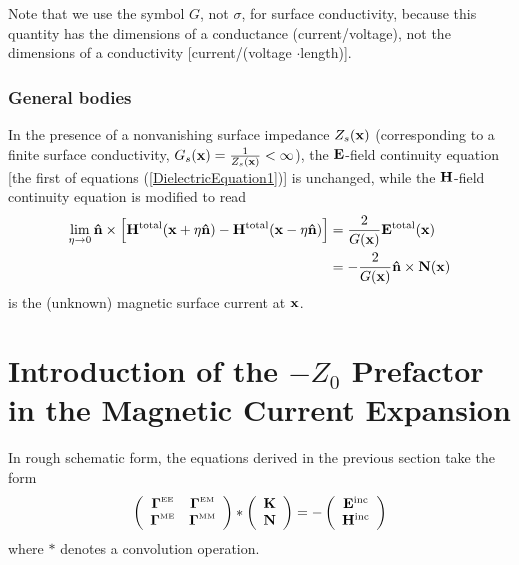 \documentclass[letterpaper]{article}
\begin{document}
Note that we use the symbol $G$, not $\sigma$, for surface
conductivity, because this quantity has the dimensions of a 
conductance (current/voltage), not the dimensions of a conductivity
[current/(voltage $\cdot $length)].

\subsubsection*{General bodies} 

In the presence of a nonvanishing surface impedance $Z_s(\mathbf{x})$
(corresponding to a finite surface conductivity, 
 $G_s(\mathbf{x}) = \frac{1}{Z_s(\mathbf{x})} < \infty$),
the $\mathbf{E}$-field continuity equation [the first of equations
(\ref{DielectricEquation1})] is unchanged, while the $\mathbf{H}$-field
continuity equation is modified to read
\begin{subequations}
\begin{align}
 \lim_{\eta \to 0} \mathbf{\hat n}\times 
 \Big[ \mathbf{H}^{\hbox{\scriptsize{total}}}(\mathbf{x} + \eta\mathbf{\hat n})
      -\mathbf{H}^{\hbox{\scriptsize{total}}}(\mathbf{x} - \eta\mathbf{\hat n})
 \Big] 
&= \frac{2}{G(\mathbf{x})} \mathbf{E}^{\hbox{\scriptsize{total}}}(\mathbf{x})
\\
&= -\frac{2}{G(\mathbf{x})} \mathbf{\hat n} \times \mathbf{N}(\mathbf{x})
\label{DielectricEquationZS}
\end{align}
\end{subequations}
is the (unknown) magnetic surface current at $\mathbf{x}$.

\newpage
\section{Introduction of the $-Z_0$ Prefactor in the 
         Magnetic Current Expansion} 

In rough schematic form, the equations derived in the 
previous section take the form 
$$ \left( \begin{array}{cc}
   \boldsymbol{\Gamma}^{\hbox{\tiny{EE}}} & \boldsymbol{\Gamma}^{\hbox{\tiny{EM}}} \\
   \boldsymbol{\Gamma}^{\hbox{\tiny{ME}}} & \boldsymbol{\Gamma}^{\hbox{\tiny{MM}}} \\
   \end{array} \right)
   *
   \left( \begin{array}{c} \mathbf{K} \\  \mathbf{N}\end{array}\right)
   = 
   -
   \left( \begin{array}{c}
   \mathbf{E}^{\hbox{\scriptsize{inc}}} \\
   \mathbf{H}^{\hbox{\scriptsize{inc}}} \\
   \end{array}\right)
$$
where $*$ denotes a convolution operation.
\end{document}
